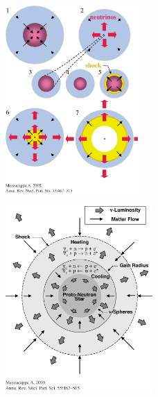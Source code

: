\documentclass{beamer}
\begin{document}
\begin{frame}

  \begin{figure}[htb!]
    \centering
    \includegraphics[width=0.45\textwidth]{fig.explosion.jpeg}
  \end{figure}

\end{frame}

\begin{frame}

  \begin{figure}[htb!]
    \centering
    \includegraphics[width=0.5\textwidth]{fig.pns.jpeg}
  \end{figure}

\end{frame}
\end{document}
